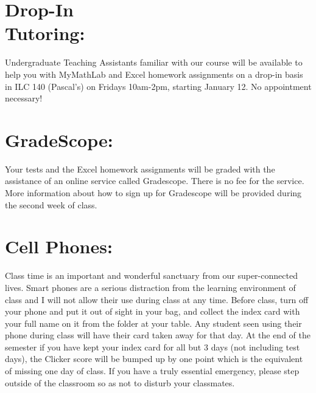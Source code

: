 \documentclass[11pt]{article}
\newcommand{\red}[1]{\textcolor{red}{#1}}
\begin{document}

\section{\textbf{Drop-In\\ Tutoring:}}
\vspace{-1.3cm}
\hangindent=5cm 
Undergraduate Teaching Assistants familiar with our course will be available to help you with MyMathLab and Excel homework assignments on a drop-in basis in ILC 140 (Pascal's) on Fridays 10am-2pm, starting January 12.
No appointment necessary!

\vspace{0.5cm}


\section{\textbf{GradeScope:}}
\vspace{-.65cm}
\hangindent=5cm 
Your tests and the Excel homework assignments will be graded with the assistance of an online service called Gradescope.
There is no fee for the service.
More information about how to sign up for Gradescope will be provided during the second week of class.


\vspace{0.5cm}


\section{\textbf{Cell Phones:}}
\vspace{-.65cm}
\hangindent=5cm 
Class time is an important and wonderful sanctuary from our super-connected lives.
Smart phones are a serious distraction from the learning environment of class and I will not allow their use during class at any time.
Before class, turn off your phone and put it out of sight in your bag, and collect the index card with your full name on it from the folder at your table. Any student seen using their phone during class will have their card taken away for that day. At the end of the semester if you have kept your index card for all but 3 days (not including test days), the Clicker score will be bumped up by one point which is the equivalent of missing one day of class.
If you have a truly essential emergency, please step outside of the classroom so as not to disturb your classmates.\\
\end{document}
